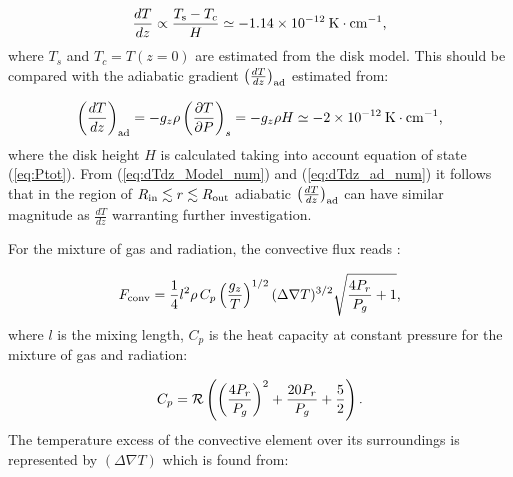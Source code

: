 \documentclass[12pt,english,preprint]{aastex}
\newcommand{\su}[2]{#1_{\rm #2}}
\newcommand{\Rout}{\su{R}{out}}
\newcommand{\Rin}{\su{R}{in}}
\begin{document}
\begin{equation}
\frac{dT}{dz}\propto\frac{T_{{\rm s}}-T_{c}}{H}\simeq-1.14\times10^{-12}\:{\rm K}\cdot{\rm cm}^{-1}\mbox{,}\label{eq:dTdz_Model_num}
\end{equation}
where $T_{s}$ and $T_{c}=T(z=0)$ are estimated from the disk model.
This should be compared with the adiabatic gradient 
$\left(\frac{dT}{dz}\right)_{{\rm ad}}$ estimated from:

\begin{equation}
\left(\frac{dT}{dz}\right)_{{\rm ad}}=
-g_{z}\rho\left(\frac{\partial T}{\partial P}\right)_{s}=-g_{z}\rho H
\simeq-2\times10^{-12}\:{\rm K}\cdot{\rm cm}^{-1}\mbox{\mbox{,}}\label{eq:dTdz_ad_num}
\end{equation}
where the disk height $H$ is calculated taking into account equation
of state (\ref{eq:Ptot}). From
(\ref{eq:dTdz_Model_num}) and (\ref{eq:dTdz_ad_num}) it follows that
in the region of $\Rin\lesssim r\lesssim \Rout$ adiabatic
$\left(\frac{dT}{dz}\right)_{{\rm ad}}$ can have similar magnitude
as $\frac{dT}{dz}$ warranting further investigation. 

For the mixture of gas and radiation, the convective flux reads \citep{KippenhahnWeigert94,BisnovatyiKogan2001book}:

\begin{equation}
F_{{\rm conv}}=\frac{1}{4}l^{2}\rho\,C_{p}\left(\frac{g_{z}}{T}\right)^{1/2}(\Delta\nabla T)^{3/2}\sqrt{\frac{4P_r}{P_{g}}+1}\mbox{,}\label{eq:Fconv}
\end{equation}
where $l$ is the mixing length, $C_{p}$ is the heat capacity at constant pressure for the mixture
of gas and radiation:

\begin{equation}
C_{p}={\cal R}\left(\left(\frac{4P_r}{P_{g}}\right)^{2}+\frac{20P_r}{P_{g}}+\frac{5}{2}\right)\mbox{.}\label{eq:Cp}
\end{equation}
The temperature excess of the convective element over its surroundings
is represented by $(\Delta\nabla T)$ which is found from:
\end{document}
